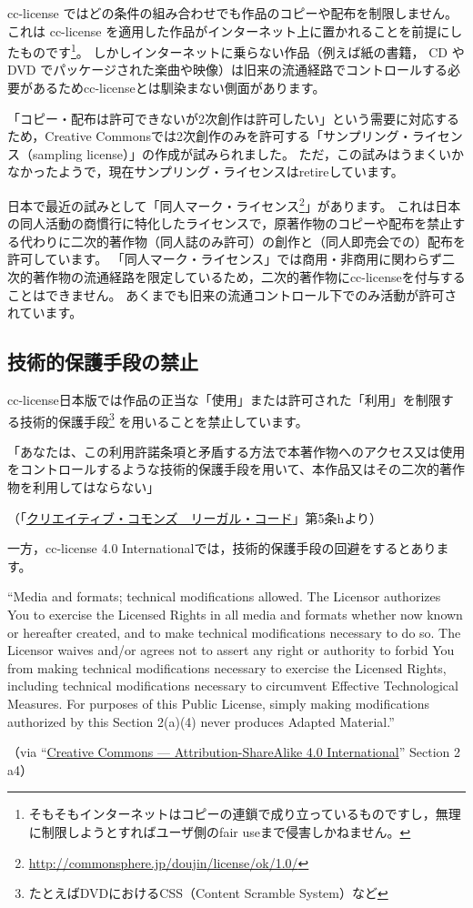 \documentclass{ltjsarticle}
\renewcommand{\emph}[1]{\textsf{\textgt{#1}}} %
\begin{document}
cc-license ではどの条件の組み合わせでも作品のコピーや配布を制限しません。
これは cc-license を適用した作品がインターネット上に置かれることを前提にしたものです\footnote{そもそもインターネットはコピーの連鎖で成り立っているものですし，無理に制限しようとすればユーザ側のfair useまで侵害しかねません。}。
しかしインターネットに乗らない作品（例えば紙の書籍， CD や DVD でパッケージされた楽曲や映像）は旧来の流通経路でコントロールする必要があるためcc-licenseとは馴染まない側面があります。

「コピー・配布は許可できないが2次創作は許可したい」という需要に対応するため，Creative Commonsでは2次創作のみを許可する「サンプリング・ライセンス（sampling license）」の作成が試みられました。
ただ，この試みはうまくいかなかったようで，現在サンプリング・ライセンスはretireしています。

日本で最近の試みとして「同人マーク・ライセンス\footnote{\url{http://commonsphere.jp/doujin/license/ok/1.0/}}」があります。
これは日本の同人活動の商慣行に特化したライセンスで，原著作物のコピーや配布を禁止する代わりに二次的著作物（同人誌のみ許可）の創作と（同人即売会での）配布を許可しています。
「同人マーク・ライセンス」では商用・非商用に関わらず二次的著作物の流通経路を限定しているため，二次的著作物にcc-licenseを付与することはできません。
あくまでも旧来の流通コントロール下でのみ活動が許可されています。


\subsection{技術的保護手段の禁止} \label{sec:drm}

cc-license日本版では作品の正当な「使用」または許可された「利用」を制限する技術的保護手段\footnote{たとえばDVDにおけるCSS（Content Scramble System）など} を用いることを禁止しています。
\begin{mdframed}
「あなたは、この利用許諾条項と矛盾する方法で本著作物へのアクセス又は使用をコントロールするような技術的保護手段を用いて、本作品又はその二次的著作物を利用してはならない」\par
（「\href{http://creativecommons.org/licenses/by-sa/2.1/jp/legalcode}{クリエイティブ・コモンズ　リーガル・コード}」第5条hより）
\end{mdframed}
一方，cc-license 4.0 Internationalでは，技術的保護手段の回避を\emph{許可}するとあります。
\begin{mdframed}
``Media and formats; technical modifications allowed. The Licensor authorizes You to exercise the Licensed Rights in all media and formats whether now known or hereafter created, and to make technical modifications necessary to do so. The Licensor waives and/or agrees not to assert any right or authority to forbid You from making technical modifications necessary to exercise the Licensed Rights, including technical modifications necessary to circumvent Effective Technological Measures. For purposes of this Public License, simply making modifications authorized by this Section 2(a)(4) never produces Adapted Material.'' \par
（via ``\href{http://creativecommons.org/licenses/by-sa/4.0/legalcode}{Creative Commons — Attribution-ShareAlike 4.0 International}'' Section 2 a4）
\end{mdframed}
\end{document}

